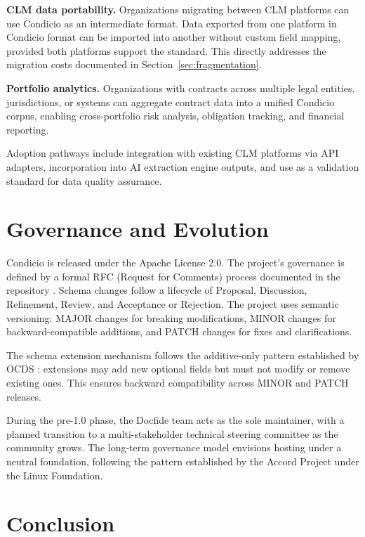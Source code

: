 \documentclass[11pt,a4paper]{article}
\begin{document}
\textbf{CLM data portability.} Organizations migrating between CLM platforms can use Condicio as an intermediate format. Data exported from one platform in Condicio format can be imported into another without custom field mapping, provided both platforms support the standard. This directly addresses the migration costs documented in Section~\ref{sec:fragmentation}.

\textbf{Portfolio analytics.} Organizations with contracts across multiple legal entities, jurisdictions, or systems can aggregate contract data into a unified Condicio corpus, enabling cross-portfolio risk analysis, obligation tracking, and financial reporting.

Adoption pathways include integration with existing CLM platforms via API adapters, incorporation into AI extraction engine outputs, and use as a validation standard for data quality assurance.

\section{Governance and Evolution}

Condicio is released under the Apache License 2.0. The project's governance is defined by a formal RFC (Request for Comments) process documented in the repository \cite{condicio-governance}. Schema changes follow a lifecycle of Proposal, Discussion, Refinement, Review, and Acceptance or Rejection. The project uses semantic versioning: MAJOR changes for breaking modifications, MINOR changes for backward-compatible additions, and PATCH changes for fixes and clarifications.

The schema extension mechanism follows the additive-only pattern established by OCDS \cite{ocds-extensions}: extensions may add new optional fields but must not modify or remove existing ones. This ensures backward compatibility across MINOR and PATCH releases.

During the pre-1.0 phase, the Docfide team acts as the sole maintainer, with a planned transition to a multi-stakeholder technical steering committee as the community grows. The long-term governance model envisions hosting under a neutral foundation, following the pattern established by the Accord Project under the Linux Foundation.

\section{Conclusion}
\end{document}
